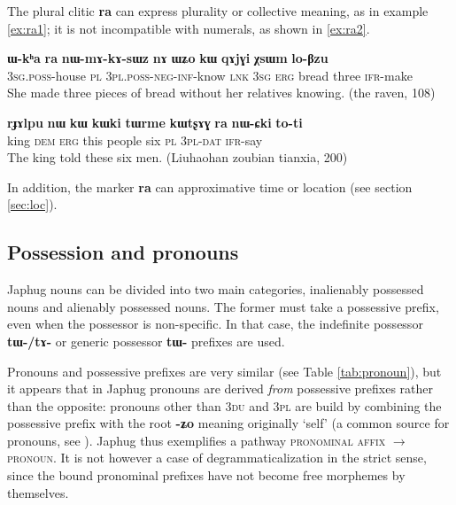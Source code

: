 \documentclass[oldfontcommands,oneside,a4paper,11pt]{article}
\newcommand{\ipa}[1]{\mbox{\phon\textbf{#1}}} %
\begin{document}
  The plural clitic \ipa{ra} can express plurality or collective meaning, as in example \ref{ex:ra1}; it is not incompatible with numerals, as shown in \ref{ex:ra2}.
 
\begin{exe}
\ex \label{ex:ra1}
\gll \ipa{ɯ-kʰa} 	\ipa{ra} 	\ipa{nɯ-mɤ-kɤ-sɯz} 	\ipa{nɤ} 	\ipa{ɯʑo} 	\ipa{kɯ} 	\ipa{qɤjɣi} 	\ipa{χsɯm} 	\ipa{lo-βzu} \\
\textsc{3sg.poss}-house \textsc{pl} \textsc{3pl.poss-neg-inf}-know \textsc{lnk} \textsc{3sg} \textsc{erg} bread three \textsc{ifr}-make \\
\glt She made three pieces of bread without her relatives knowing. (the raven, 108)
\end{exe}

\begin{exe}
\ex \label{ex:ra2}
\gll 
 \ipa{rɟɤlpu} 	\ipa{nɯ} 	\ipa{kɯ} 	\ipa{kɯki} 	\ipa{tɯrme} 	\ipa{kɯtʂɤɣ} 	\ipa{ra} 	\ipa{nɯ-ɕki}  	\ipa{to-ti} \\
 king \textsc{dem} \textsc{erg} this people six \textsc{pl} \textsc{3pl-dat} \textsc{ifr}-say  \\
 \glt The king told these six men. (Liuhaohan zoubian tianxia, 200)
\end{exe}

In addition, the marker \ipa{ra} can approximative time or location  (see section  \ref{sec:loc}).
 


 \subsection{Possession and pronouns} \label{sec:pronouns}
 
Japhug  nouns can be divided into two main categories, inalienably possessed nouns and alienably possessed nouns. The former must take a possessive prefix, even when the possessor is non-specific. In that case, the indefinite possessor \ipa{tɯ-/tɤ-} or generic possessor \ipa{tɯ-} prefixes are used.

Pronouns  and possessive prefixes are very similar (see Table \ref{tab:pronoun}), but it appears that in Japhug pronouns are derived \textit{from} possessive prefixes rather than the opposite: pronouns other than \textsc{3du} and \textsc{3pl} are build by combining the possessive prefix with the root \ipa{-ʑo} meaning originally `self' (a common source for pronouns, see \citealt{heine11pronoms}). Japhug thus exemplifies a pathway \textsc{pronominal affix} $\rightarrow$ \textsc{pronoun}. It is not however a case of degrammaticalization in the strict sense, since the bound pronominal prefixes have not become free morphemes by themselves.
\end{document}
